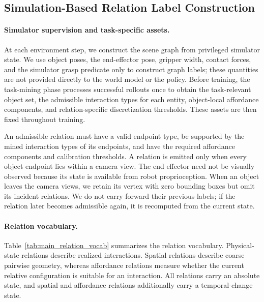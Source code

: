 \subsection{Simulation-Based Relation Label Construction}
\label{app:relation_label_construction}

\paragraph{Simulator supervision and task-specific assets.}
At each environment step, we construct the scene graph from privileged
simulator state. We use object poses, the end-effector pose, gripper width,
contact forces, and the simulator grasp predicate only to construct graph
labels; these quantities are not provided directly to the world model or the
policy. Before training, the task-mining phase processes successful rollouts
once to obtain the task-relevant object set, the admissible interaction types
for each entity, object-local affordance components, and relation-specific
discretization thresholds. These assets are then fixed throughout training.

An admissible relation must have a valid endpoint type, be supported by the
mined interaction types of its endpoints, and have the required affordance
components and calibration thresholds. A relation is emitted only when every
object endpoint lies within a camera view. The end effector need not be
visually observed because its state is available from robot proprioception.
When an object leaves the camera views, we retain its vertex with zero bounding
boxes but omit its incident relations. We do not carry forward their previous
labels; if the relation later becomes admissible again, it is recomputed from
the current state.

\paragraph{Relation vocabulary.}
Table~\ref{tab:main_relation_vocab} summarizes the relation vocabulary.
Physical-state relations describe realized interactions. Spatial relations
describe coarse pairwise geometry, whereas affordance relations measure
whether the current relative configuration is suitable for an interaction.
All relations carry an absolute state, and spatial and affordance relations
additionally carry a temporal-change state.

